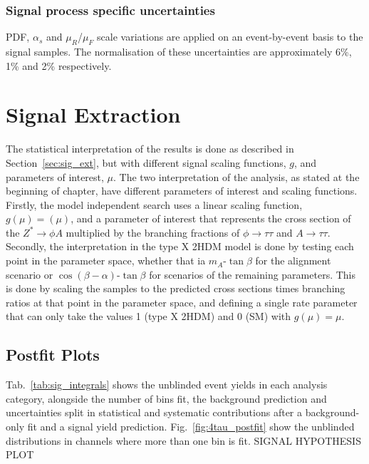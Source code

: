 \subsubsection{Signal process specific uncertainties}
PDF, $\alpha_s$ and $\mu_{R}$/$\mu_{F}$ scale variations are applied on an event-by-event basis to the signal samples.
The normalisation of these uncertainties are approximately 6\%, 1\% and 2\% respectively.

\section{Signal Extraction}

The statistical interpretation of the results is done as described in Section~\ref{sec:sig_ext}, but with different signal scaling functions, $g$, and parameters of interest, $\mu$.
The two interpretation of the analysis, as stated at the beginning of chapter, have different parameters of interest and scaling functions. \\

Firstly, the model independent search uses a linear scaling function, $g(\mu)=(\mu)$, and a parameter of interest that represents the cross section of the $Z^{*}\rightarrow \phi A$ multiplied by the branching fractions of $\phi\rightarrow\tau\tau$ and $A\rightarrow\tau\tau$.
Secondly, the interpretation in the type X 2HDM model is done by testing each point in the parameter space, whether that ia $m_{A}$-$\tan\beta$ for the alignment scenario or $\cos(\beta-\alpha)$-$\tan\beta$ for scenarios of the remaining parameters. 
This is done by scaling the samples to the predicted cross sections times branching ratios at that point in the parameter space, and defining a single rate parameter that can only take the values 1 (type X 2HDM) and 0 (SM) with $g(\mu)=\mu$.

\subsection{Postfit Plots}

Tab.~\ref{tab:sig_integrals} shows the unblinded event yields in each analysis category, alongside the number of bins fit, the background prediction and uncertainties split in statistical and systematic contributions after a background-only fit and a signal yield prediction.
Fig.~\ref{fig:4tau_postfit} show the unblinded distributions in channels where more than one bin is fit.
SIGNAL HYPOTHESIS PLOT \\

